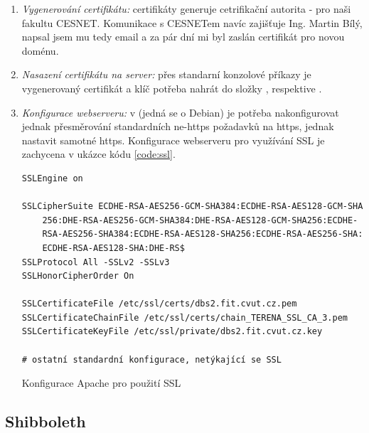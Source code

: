 \begin{enumerate}
	\item \emph{Vygenerování certifikátu:} certifikáty generuje cetrifikační autorita - pro naši fakultu CESNET. Komunikace s CESNETem navíc zajišťuje Ing. Martin Bílý, napsal jsem mu tedy email a za pár dní mi byl zaslán certifikát pro novou doménu.
	\item \emph{Nasazení certifikátu na server:} přes standarní konzolové příkazy je vygenerovaný certifikát a klíč potřeba nahrát do složky , respektive .
	\item \emph{Konfigurace webserveru:} v  (jedná se o Debian) je potřeba nakonfigurovat jednak přesměrování standardních ne-https požadavků na https, jednak nastavit samotné https. Konfigurace  webserveru pro využívání SSL je zachycena v ukázce kódu \ref{code:ssl}.
	\begin{listing}
		\expandafter\def\csname PY@tok@err\endcsname{} %
		\begin{verbatim}
SSLEngine on

SSLCipherSuite ECDHE-RSA-AES256-GCM-SHA384:ECDHE-RSA-AES128-GCM-SHA
    256:DHE-RSA-AES256-GCM-SHA384:DHE-RSA-AES128-GCM-SHA256:ECDHE-
    RSA-AES256-SHA384:ECDHE-RSA-AES128-SHA256:ECDHE-RSA-AES256-SHA:
    ECDHE-RSA-AES128-SHA:DHE-RS$
SSLProtocol All -SSLv2 -SSLv3
SSLHonorCipherOrder On

SSLCertificateFile /etc/ssl/certs/dbs2.fit.cvut.cz.pem
SSLCertificateChainFile /etc/ssl/certs/chain_TERENA_SSL_CA_3.pem
SSLCertificateKeyFile /etc/ssl/private/dbs2.fit.cvut.cz.key

# ostatní standardní konfigurace, netýkající se SSL
		\end{verbatim}
		\caption{Konfigurace Apache pro použití SSL} \label{code:ssl}
	\end{listing}
\end{enumerate}

\subsection{Shibboleth} \label{app:shibboleth}


